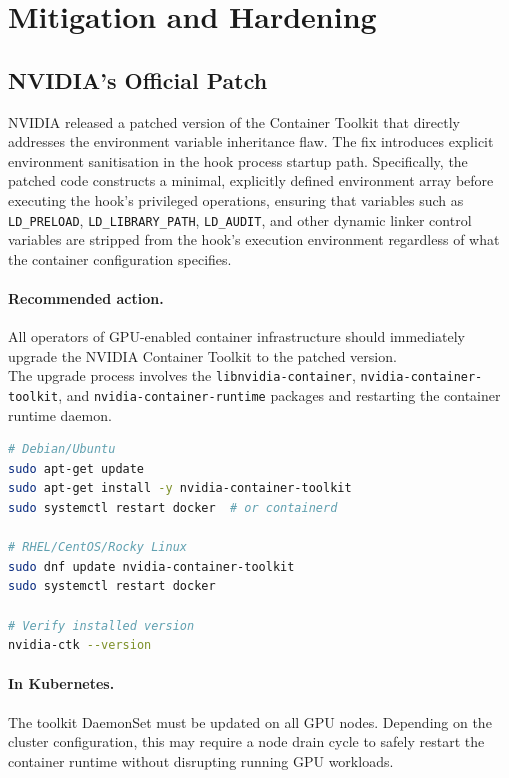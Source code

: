 \section{Mitigation and Hardening}
\label{sec:mitigation}

\subsection{NVIDIA's Official Patch}
\label{subsec:patch}

NVIDIA released a patched version of the Container Toolkit that directly addresses the environment variable inheritance flaw. The fix introduces explicit environment sanitisation in the hook process startup path. Specifically, the patched code constructs a minimal, explicitly defined environment array before executing the hook's privileged operations, ensuring that variables such as \texttt{LD\_PRELOAD}, \texttt{LD\_LIBRARY\_PATH}, \texttt{LD\_AUDIT}, and other dynamic linker control variables are stripped from the hook's execution environment regardless of what the container configuration specifies.
 
\paragraph{Recommended action.} All operators of GPU-enabled container infrastructure should immediately upgrade the NVIDIA Container Toolkit to the patched version.\\ The upgrade process involves the \texttt{libnvidia-container}, \texttt{nvidia-container-toolkit}, and \texttt{nvidia-container-runtime} packages and restarting the container runtime daemon.

\begin{lstlisting}[language=bash, caption={Package upgrade commands for common Linux distributions.}]
# Debian/Ubuntu
sudo apt-get update
sudo apt-get install -y nvidia-container-toolkit
sudo systemctl restart docker  # or containerd
 
# RHEL/CentOS/Rocky Linux
sudo dnf update nvidia-container-toolkit
sudo systemctl restart docker
 
# Verify installed version
nvidia-ctk --version
\end{lstlisting}
 
\paragraph{In Kubernetes.} The toolkit DaemonSet must be updated on all GPU nodes. Depending on the cluster configuration, this may require a node drain cycle to safely restart the container runtime without disrupting running GPU workloads.

